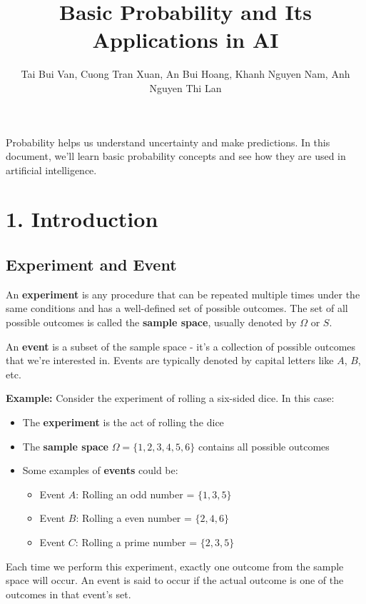 \documentclass{article}
\title{Basic Probability and Its Applications in AI}
\author{Tai Bui Van, Cuong Tran Xuan, An Bui Hoang, Khanh Nguyen Nam, Anh Nguyen Thi Lan}
\date{}
\begin{document}
\maketitle
Probability helps us understand uncertainty and make predictions.
In this document, we'll learn basic probability concepts and see how they are used in artificial intelligence.

\section*{1. Introduction}

\subsection*{Experiment and Event}

An \textbf{experiment} is any procedure that can be repeated multiple times under the same conditions and has a well-defined set of possible outcomes.
The set of all possible outcomes is called the \textbf{sample space}, usually denoted by $\Omega$ or $S$.

An \textbf{event} is a subset of the sample space - it's a collection of possible outcomes that we're interested in. Events are typically denoted by capital letters like $A$, $B$, etc.

\textbf{Example:}
Consider the experiment of rolling a six-sided dice. In this case:

\begin{itemize}
    \item The \textbf{experiment} is the act of rolling the dice
    \item The \textbf{sample space} $\Omega = \{1, 2, 3, 4, 5, 6\}$ contains all possible outcomes
    \item Some examples of \textbf{events} could be:
    \begin{itemize}
        \item Event $A$: Rolling an odd number = $\{1, 3, 5\}$
        \item Event $B$: Rolling a even number = $\{2, 4, 6\}$
        \item Event $C$: Rolling a prime number = $\{2, 3, 5\}$
    \end{itemize}
\end{itemize}

Each time we perform this experiment, exactly one outcome from the sample space will occur. An event is said to occur if the actual outcome is one of the outcomes in that event's set.
\end{document}
